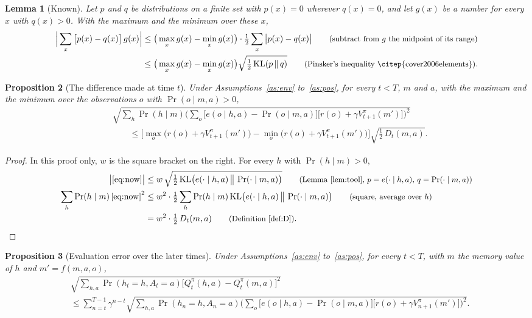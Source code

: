 \documentclass{article}
\newtheorem{proposition}{Proposition}[section]
\newtheorem{lemma}[proposition]{Lemma}
\theoremstyle{definition}
\numberwithin{equation}{section}
\newcommand{\KL}{\mathrm{KL}}
\newcommand{\why}[1]{\tag*{\small(#1)}}
\begin{document}
\begin{lemma}[Known]\label{lem:tool}
Let $p$ and $q$ be distributions on a finite set with $p(x)=0$ wherever $q(x)=0$, and let $g(x)$ be a number for every $x$ with $q(x)>0$. With the maximum and the minimum over these $x$,
\begin{align*}
\Big|\sum_x\big[p(x)-q(x)\big]\,g(x)\Big|
&\le\big(\max_xg(x)-\min_xg(x)\big)\cdot\tfrac12\sum_x\big|p(x)-q(x)\big| \why{subtract from $g$ the midpoint of its range}\\
&\le\big(\max_xg(x)-\min_xg(x)\big)\sqrt{\tfrac12\,\KL(p\,\|\,q)} \why{Pinsker's inequality \citep{cover2006elements}}.
\end{align*}
\end{lemma}

\begin{proposition}[The difference made at time $t$]\label{prop:now}
Under Assumptions~\ref{as:env} to~\ref{as:pos}, for every $t<T$, $m$ and $a$, with the maximum and the minimum over the observations $o$ with $\Pr(o\mid m,a)>0$,
\begin{align*}
&\sqrt{\sum_h\Pr(h\mid m)\Big(\sum_o\big[e(o\mid h,a)-\Pr(o\mid m,a)\big]\big[r(o)+\gamma V^\pi_{t+1}(m')\big]\Big)^2}\\
&\qquad\le\Big[\max_o\big(r(o)+\gamma V^\pi_{t+1}(m')\big)-\min_o\big(r(o)+\gamma V^\pi_{t+1}(m')\big)\Big]\sqrt{\tfrac12\,D_t(m,a)}.
\end{align*}
\end{proposition}

\begin{proof}
In this proof only, $w$ is the square bracket on the right. For every $h$ with $\Pr(h\mid m)>0$,
\begin{align*}
\big|\eqref{eq:now}\big|&\le w\,\sqrt{\tfrac12\,\KL\big(e(\cdot\mid h,a)\,\big\|\,\Pr(\cdot\mid m,a)\big)} \why{Lemma~\ref{lem:tool}, $p=e(\cdot\mid h,a)$, $q=\Pr(\cdot\mid m,a)$}\\
\sum_h\Pr(h\mid m)\,\eqref{eq:now}^2&\le w^2\cdot\tfrac12\sum_h\Pr(h\mid m)\,\KL\big(e(\cdot\mid h,a)\,\big\|\,\Pr(\cdot\mid m,a)\big) \why{square, average over $h$}\\
&=w^2\cdot\tfrac12\,D_t(m,a) \why{Definition~\ref{def:D}}.
\end{align*}
\end{proof}

\begin{proposition}[Evaluation error over the later times]\label{prop:eval}
Under Assumptions~\ref{as:env} to~\ref{as:pos}, for every $t<T$, with $m$ the memory value of $h$ and $m'=f(m,a,o)$,
\begin{align*}
&\sqrt{\sum_{h,a}\Pr(h_t=h,A_t=a)\big[Q^\pi_t(h,a)-Q^\pi_t(m,a)\big]^2}\\
&\le\sum_{n=t}^{T-1}\gamma^{n-t}\sqrt{\sum_{h,a}\Pr(h_n=h,A_n=a)\Big(\sum_o\big[e(o\mid h,a)-\Pr(o\mid m,a)\big]\big[r(o)+\gamma V^\pi_{n+1}(m')\big]\Big)^2}.
\end{align*}
\end{proposition}
\end{document}
